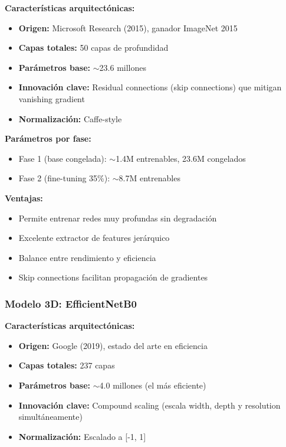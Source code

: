 \documentclass[11pt, a4paper]{article}
\begin{document}
\textbf{Características arquitectónicas:}
\begin{itemize}
    \item \textbf{Origen:} Microsoft Research (2015), ganador ImageNet 2015
    \item \textbf{Capas totales:} 50 capas de profundidad
    \item \textbf{Parámetros base:} $\sim$23.6 millones
    \item \textbf{Innovación clave:} Residual connections (skip connections) que mitigan vanishing gradient
    \item \textbf{Normalización:} Caffe-style
\end{itemize}

\textbf{Parámetros por fase:}
\begin{itemize}
    \item Fase 1 (base congelada): $\sim$1.4M entrenables, 23.6M congelados
    \item Fase 2 (fine-tuning 35\%): $\sim$8.7M entrenables
\end{itemize}

\textbf{Ventajas:}
\begin{itemize}
    \item Permite entrenar redes muy profundas sin degradación
    \item Excelente extractor de features jerárquico
    \item Balance entre rendimiento y eficiencia
    \item Skip connections facilitan propagación de gradientes
\end{itemize}

\subsubsection{Modelo 3D: EfficientNetB0}

\textbf{Características arquitectónicas:}
\begin{itemize}
    \item \textbf{Origen:} Google (2019), estado del arte en eficiencia
    \item \textbf{Capas totales:} 237 capas
    \item \textbf{Parámetros base:} $\sim$4.0 millones (el más eficiente)
    \item \textbf{Innovación clave:} Compound scaling (escala width, depth y resolution simultáneamente)
    \item \textbf{Normalización:} Escalado a [-1, 1]
\end{itemize}
\end{document}
